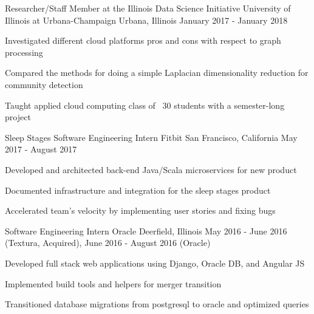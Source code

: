 \begin{cventries}
  \cventry
    {Researcher/Staff Member at the Illinois Data Science Initiative}
    {University of Illinois at Urbana-Champaign}
    {Urbana, Illinois} %
    {January 2017 - January 2018} %
    {
      \begin{cvitems} %
        \item {Investigated different cloud platforms pros and cons with respect to graph processing}
        \item {Compared the methods for doing a simple Laplacian dimensionality reduction for community detection}
        \item {Taught applied cloud computing class of ~30 students with a semester-long project}
      \end{cvitems}
    }

  \cventry
    {Sleep Stages Software Engineering Intern}
    {Fitbit}
    {San Francisco, California} %
    {May 2017 - August 2017} %
    {
      \begin{cvitems} %
        \item {Developed and architected back-end Java/Scala microservices for new product}
        \item {Documented infrastructure and integration for the sleep stages product}
        \item {Accelerated team’s velocity by implementing user stories and fixing bugs}
      \end{cvitems}
    }

  \cventry
    {Software Engineering Intern}
    {Oracle}
    {Deerfield, Illinois} %
    {May 2016 - June 2016 (Textura, Acquired), June 2016 - August 2016 (Oracle)} %
    {
      \begin{cvitems} %
        \item {Developed full stack web applications using Django, Oracle DB, and Angular JS}
        \item {Implemented build tools and helpers for merger transition}
        \item {Transitioned database migrations from postgresql to oracle and optimized queries}
      \end{cvitems}
    }

\end{cventries}
